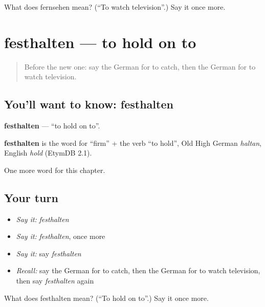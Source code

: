 \begin{tcolorbox}[breakable,colback=teal!4,colframe=teal!35!black,title={Before you move on}]
What does fernsehen mean? (\textquotedblleft{}To watch television\textquotedblright{}.) Say it once more.
\end{tcolorbox}
\section[festhalten]{festhalten — to hold on to}

\label{lesson:GE-C180-festhalten}



\begin{quote}
Before the new one: say the German for to catch, then the German for to watch television.
\end{quote}

\subsection*{You'll want to know: festhalten}
\textbf{festhalten} — \textquotedblleft{}to hold on to\textquotedblright{}.

\begin{cousinweb}
\textbf{festhalten} is the word for \textquotedblleft{}firm\textquotedblright{} + the verb \textquotedblleft{}to hold\textquotedblright{}, Old High German \emph{haltan}, English \emph{hold} (EtymDB 2.1).
\end{cousinweb}

\begin{grammarlens}[title={What you've built}]
One more word for this chapter.
\end{grammarlens}

\subsection*{Your turn}
\begin{itemize}
\raggedright
  \item \emph{Say it:} \emph{festhalten}
  \item \emph{Say it:} \emph{festhalten}, once more
  \item \emph{Say it:} say \emph{festhalten}
  \item \emph{Recall:} say the German for to catch, then the German for to watch television, then say \emph{festhalten} again
\end{itemize}

\begin{tcolorbox}[breakable,colback=teal!4,colframe=teal!35!black,title={Before you move on}]
What does festhalten mean? (\textquotedblleft{}To hold on to\textquotedblright{}.) Say it once more.
\end{tcolorbox}
